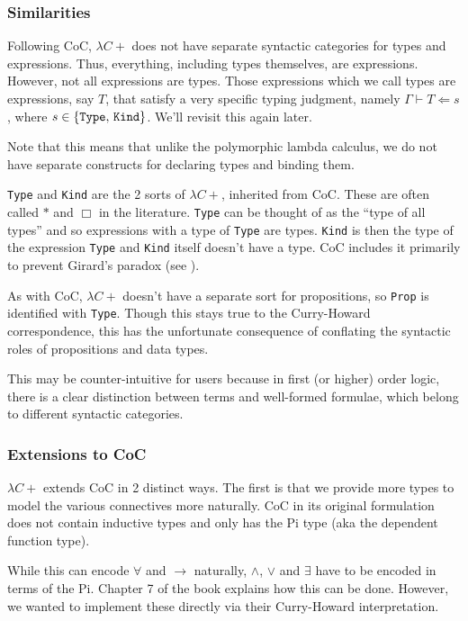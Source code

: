 \documentclass{article}
\begin{document}
\subsubsection{Similarities}
Following CoC, $\lambda C+$ does not have separate syntactic categories for types
and expressions. Thus, everything, including types themselves, are expressions.
However, not all expressions are types.
Those expressions which we call types are expressions, say $T$, that satisfy
a very specific typing judgment, namely $\Gamma \vdash T \Leftarrow s$,
where $s \in \{ \texttt{Type}, \, \texttt{Kind} \}$. We'll revisit this again later.

Note that this means that unlike the polymorphic lambda calculus, we do not have
separate constructs for declaring types and binding them.

\texttt{Type} and \texttt{Kind} are the 2 sorts of $\lambda C+$, inherited from
CoC. These are often called $*$ and $\Box$ in the literature.
\texttt{Type} can be thought of as the ``type of all types'' and so expressions
with a type of \texttt{Type} are types.
\texttt{Kind} is then the type of the expression \texttt{Type} and
\texttt{Kind} itself doesn't have a type.
CoC includes it primarily to prevent Girard's paradox
(see \cite{analysis_of_girard}).

As with CoC, $\lambda C+$ doesn't have a separate sort for propositions, so 
\texttt{Prop} is identified with \texttt{Type}.
Though this stays true to the Curry-Howard correspondence, this has the
unfortunate consequence of conflating the syntactic roles of propositions and
data types.
  
This may be counter-intuitive for users because in first (or higher) order
logic, there is a clear distinction between terms and well-formed formulae,
which belong to different syntactic categories. 

\subsubsection{Extensions to CoC}
$\lambda C+$ extends CoC in 2 distinct ways. The first is that we provide more
types to model the various connectives more naturally.
CoC in its original formulation does not contain inductive types and only has
the Pi type (aka the dependent function type).

While this can encode $\forall$ and $\rightarrow$ naturally, $\wedge$, $\vee$ and
$\exists$ have to be encoded in terms of the Pi.
Chapter 7 of the book \cite{type_theory_and_formal_proof} explains how this can
be done.
However, we wanted to implement these directly via their Curry-Howard
interpretation.
\end{document}
